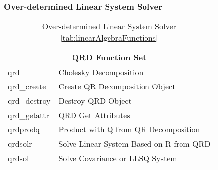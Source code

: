 \subsubsection*{Over-determined Linear System Solver} 
\begin{table}[H]
\caption{Over-determined Linear System Solver \ref{tab:linearAlgebraFunctions}}
\label{tab:overDeterminedSolver}
\begin{center}
\begin{tabular}{|l|l|}
\multicolumn{2}{c}{\hyperlink{qrdFunc}{\rmfamily \bfseries QRD Function Set}}\\
\hline
qrd & Cholesky Decomposition\\
qrd\_create & Create QR Decomposition Object\\
qrd\_destroy & Destroy QRD Object\\
qrd\_getattr & QRD Get Attributes\\
qrdprodq & Product with Q from QR Decomposition\\
qrdsolr &Solve Linear System Based on R from QRD\\
qrdsol & Solve Covariance or LLSQ System\\
\hline\end{tabular}
\end{center}
\label{default}
\end{table}%